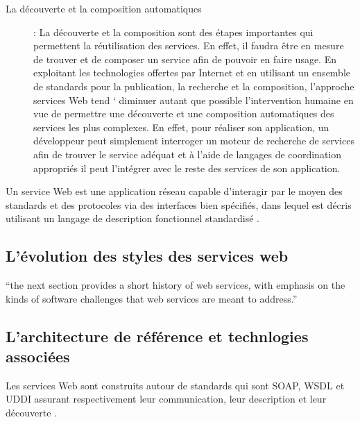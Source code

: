 \begin{description}
	    \item[La découverte et la composition automatiques] : 
		La découverte et la composition sont des étapes importantes qui permettent la réutilisation des services. 
		En effet, il faudra être en mesure de trouver et de composer un service afin de pouvoir en faire usage. 
		En exploitant les technologies offertes par Internet et en utilisant un ensemble de standards pour la 
		publication, la recherche et la composition, l'approche services Web tend ` diminuer autant que possible 
		l'intervention humaine en vue de permettre une découverte et une composition automatiques des services
		les plus complexes. En effet, pour réaliser son application, un développeur peut simplement interroger 
		un moteur de recherche de services afin de trouver le service adéquat et à l'aide de langages de 
		coordination appropriés il peut l'intégrer avec le reste des services de son application.
	\end{description}

	Un service Web est une application réseau capable d'interagir par le moyen des standards et des protocoles 
	via des interfaces bien spécifiés, dans lequel est décris utilisant un langage de description fonctionnel
	standardisé \cite{curbera2001web}.\\


    \subsection{L'évolution des styles des services web}
	``the next section provides a short history of web services, with emphasis on the kinds of software challenges
	that web services are meant to address.''

    \subsection{L'architecture de référence et technlogies associées}
	Les services Web sont construits autour de standards qui sont SOAP, WSDL et UDDI assurant respectivement leur
	communication, leur description et leur découverte .

